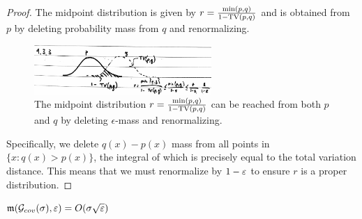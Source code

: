 \begin{proof}
    The midpoint distribution is given by $r = \frac{\min(p,q)}{1 - \operatorname{TV}(p,q)}$ and is obtained from $p$
    by deleting probability mass from $q$ and renormalizing.
    \begin{figure}[H]
        \centering
        \includegraphics[width=0.6\textwidth]{figures/9-3-3.png}
        \caption{The midpoint distribution $r = \frac{\min(p,q)}{1 - \operatorname{TV}(p,q)}$ can be reached
        from both $p$ and $q$ by deleting $\epsilon$-mass and renormalizing.}
    \end{figure}
    Specifically, we delete
    $q(x) - p(x)$ mass from all points in $\{ x : q(x) > p(x) \}$, the integral of which is precisely
    equal to the total variation distance. This means that we must renormalize by $1 - \varepsilon$ to ensure
    $r$ is a proper distribution.
\end{proof}

\begin{corollary}\label{corr:mod-cont-cov}
    $\mathfrak{m}(\mathcal{G}_{cov}(\sigma), \varepsilon) = O(\sigma \sqrt{\varepsilon})$
\end{corollary}

